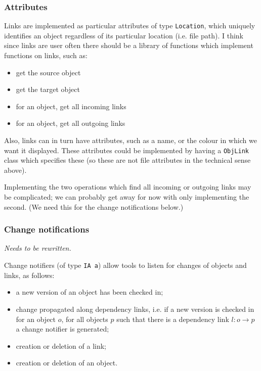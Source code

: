\documentclass[a4paper]{article}
\begin{document}



\subsubsection{Attributes}

Links are implemented as particular attributes of type
\texttt{Location}, which uniquely identifies an object regardless of
its particular location (i.e. file path). I think since links are user
often there should be a library of functions which implement functions
on links, such as:
\begin{itemize}
\item get the source object 
\item get the target object
\item for an object, get all incoming links
\item for an object, get all outgoing links
\end{itemize}

Also, links can in turn have attributes, such as a name, or the colour
in which we want it displayed. These attributes could be implemented
by having a \texttt{ObjLink} class which specifies these (so these are
not file attributes in the technical sense above).

Implementing the two operations which find all incoming or outgoing
links may be complicated; we can probably get away for now with only
implementing the second. (We need this for the change notifications
below.)

\subsubsection{Change notifications}

\emph{Needs to be rewritten.}

Change notifiers (of type \texttt{IA a}) allow tools to listen for
changes of objects and links, as follows:
\begin{itemize}
\item a new version of an object has been checked in;
\item change propagated along dependency links, i.e. if a new version
  is checked in for an object $o$, for all objects $p$ such that there
  is a dependency link $l:o\rightarrow p$ a change notifier is
  generated;
\item creation or deletion of a link;
\item creation or deletion of an object. 
\end{itemize}
\end{document}
